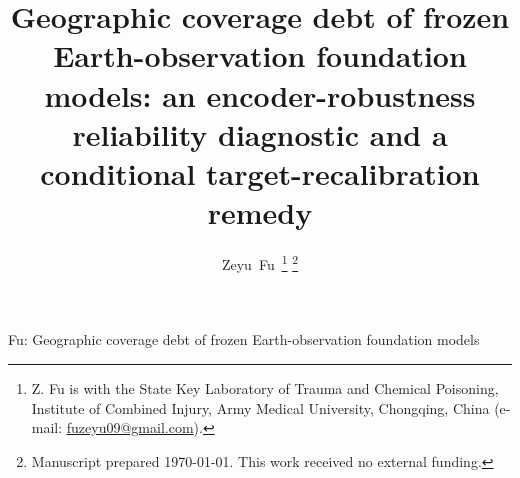 \documentclass[journal]{IEEEtran}
\renewcommand{\_}{\textunderscore\allowbreak}
\begin{document}
\title{Geographic coverage debt of frozen Earth-observation foundation models:
an encoder-robustness reliability diagnostic and a conditional
target-recalibration remedy}

\author{Zeyu~Fu\,%
\thanks{Z. Fu is with the State Key Laboratory of Trauma and Chemical Poisoning, Institute of
Combined Injury, Army Medical University, Chongqing, China (e-mail: \href{mailto:fuzeyu09@gmail.com}{fuzeyu09@gmail.com}).}%
\thanks{Manuscript prepared \today. This work received no external funding.}}

%
{Fu: Geographic coverage debt of frozen Earth-observation foundation models}

\maketitle
\end{document}
